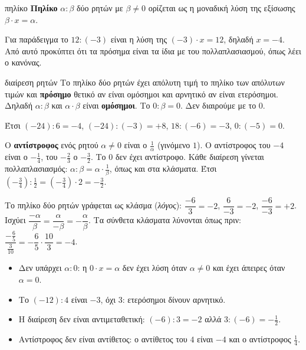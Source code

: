 \begin{orismos}{πηλίκο}
\textbf{Πηλίκο} $\alpha:\beta$ δύο ρητών με $\beta\neq0$ ορίζεται ως η μοναδική λύση της εξίσωσης $\beta\cdot x=\alpha$.
\end{orismos}

Για παράδειγμα το $12:(-3)$ είναι η λύση της $(-3)\cdot x=12$, δηλαδή $x=-4$. Από αυτό προκύπτει ότι τα πρόσημα είναι τα ίδια με του πολλαπλασιασμού, όπως λέει ο κανόνας.

\begin{kanonas}{διαίρεση ρητών}
Το πηλίκο δύο ρητών έχει απόλυτη τιμή το πηλίκο των απόλυτων τιμών και \textbf{πρόσημο} θετικό αν είναι ομόσημοι και αρνητικό αν είναι ετερόσημοι. Δηλαδή $\alpha:\beta$ και $\alpha\cdot\beta$ είναι \textbf{ομόσημοι}. Το $0:\beta=0$. Δεν διαιρούμε με το $0$.
\end{kanonas}

Έτσι $(-24):6=-4$, $(-24):(-3)=+8$, $18:(-6)=-3$, $0:(-5)=0$.


Ο \textbf{αντίστροφος} ενός ρητού $\alpha\neq0$ είναι ο $\frac{1}{\alpha}$ (γινόμενο $1$). Ο αντίστροφος του $-4$ είναι ο $-\frac{1}{4}$, του $-\frac{2}{3}$ ο $-\frac{3}{2}$. Το $0$ δεν έχει αντίστροφο. Κάθε διαίρεση γίνεται πολλαπλασιασμός: $\alpha:\beta=\alpha\cdot\frac{1}{\beta}$, όπως και στα κλάσματα. Έτσι $\left(-\frac{3}{4}\right):\frac{1}{2}=\left(-\frac{3}{4}\right)\cdot2=-\frac{3}{2}$.


Το πηλίκο δύο ρητών γράφεται ως κλάσμα (\emph{λόγος}): $\dfrac{-6}{3}=-2$, $\dfrac{6}{-3}=-2$, $\dfrac{-6}{-3}=+2$. Ισχύει $\dfrac{-\alpha}{\beta}=\dfrac{\alpha}{-\beta}=-\dfrac{\alpha}{\beta}$. Τα σύνθετα κλάσματα λύνονται όπως πριν: $\dfrac{-\frac{6}{5}}{\frac{3}{10}}=-\dfrac{6}{5}\cdot\dfrac{10}{3}=-4$.

\begin{prosoxi}
\begin{itemize}[leftmargin=1.2em,itemsep=0.3ex,topsep=2pt]
\item Δεν υπάρχει $\alpha:0$: η $0\cdot x=\alpha$ δεν έχει λύση όταν $\alpha\neq0$ και έχει άπειρες όταν $\alpha=0$.
\item Το $(-12):4$ είναι $-3$, όχι $3$: ετερόσημοι δίνουν αρνητικό.
\item Η διαίρεση δεν είναι αντιμεταθετική: $(-6):3=-2$ αλλά $3:(-6)=-\frac{1}{2}$.
\item Αντίστροφος δεν είναι αντίθετος: ο αντίθετος του $4$ είναι $-4$ και ο αντίστροφος $\frac{1}{4}$.
\end{itemize}
\end{prosoxi}

